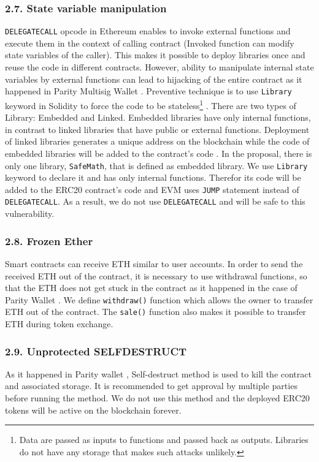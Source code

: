 \subsubsection*{2.7. State variable manipulation}
\texttt{DELEGATECALL} opcode in Ethereum enables to invoke external functions and execute them in the context of calling contract (\ie Invoked function can modify state variables of the caller). This makes it possible to deploy libraries once and reuse the code in different contracts. However, ability to manipulate internal state variables by external functions can lead to hijacking of the entire contract as it happened in Parity Multisig Wallet \cite{ParitySecondHack}. Preventive technique is to use \texttt{Library} keyword in Solidity to force the code to be stateless\footnote{Data are passed as inputs to functions and passed back as outputs. Libraries do not have any storage that makes such attacks unlikely.} \cite{LIB1}. There are two types of Library: Embedded and Linked. Embedded libraries have only internal functions, in contrast to linked libraries that have public or external functions. Deployment of linked libraries generates a unique address on the blockchain while the code of embedded libraries will be added to the contract's code \cite{LIB2}. In the proposal, there is only one library, \texttt{SafeMath}, that is defined as embedded library. We use \texttt{Library} keyword to declare it and has only internal functions. Therefor its code will be added to the ERC20 contract's code and EVM uses \texttt{JUMP} statement instead of \texttt{DELEGATECALL}. As a result, we do not use \texttt{DELEGATECALL} and will be safe to this vulnerability.

\subsubsection*{2.8. Frozen Ether}
Smart contracts can receive ETH similar to user accounts. In order to send the received ETH out of the contract, it is necessary to use withdrawal functions, so that the ETH does not get stuck in the contract as it happened in the case of Parity Wallet \cite{ParityWalletHack}. We define \texttt{withdraw()} function which allows the owner to transfer ETH out of the contract. The \texttt{sale()} function also makes it possible to transfer ETH during token exchange.

\subsubsection*{2.9. Unprotected SELFDESTRUCT}
As it happened in Parity wallet \cite{ParitySecondHack}, Self-destruct method is used to kill the contract and associated storage. It is recommended to get approval by multiple parties before running the method. We do not use this method and the deployed ERC20 tokens will be active on the blockchain forever.

